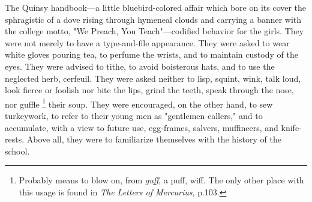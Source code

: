   The Quinsy handbook---a little bluebird-colored affair which bore on its cover
the sphragistic 
of a dove rising through hymeneal 
clouds and carrying a banner
with the college motto, "We Preach, You Teach"---codified behavior for the girls.
They were not merely to have a type-and-file appearance. They were asked to wear
white gloves pouring tea, to perfume the wrists, and to maintain custody of the
eyes. They were advised to tithe, 
to avoid boisterous 
hats, and to use the neglected herb, cerfeuil. 
They were asked neither to lisp, 
squint, wink, talk loud, look fierce or foolish nor bite the lips, grind the 
teeth, speak through the nose, nor guffle 
\footnote{ \textdbend Probably means to blow on, from \textit{guff}, a puff, 
wiff. The only other place with this usage is found in \textit{The Letters 
of Mercurius}, p.103.
}
their soup. They were encouraged, on the other hand, to sew turkeywork, 
to refer to their young men as "gentlemen callers," and to
accumulate, with a view to future use, egg-frames, salvers, 
muffineers, and knife-rests. Above all, they were to familiarize themselves with 
the history of the school.

